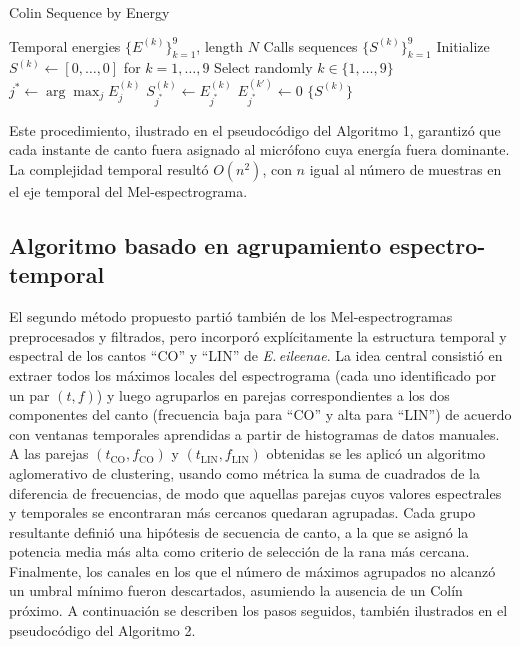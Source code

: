 \begin{algorithm}
    \caption{Colin Sequence by Energy}
    \begin{algorithmic}[1]
    \Require 
      Temporal energies \(\{E^{(k)}\}_{k=1}^9\), length \(N\)
    \Ensure
      Calls sequences \(\{S^{(k)}\}_{k=1}^9\)
    \State Initialize \(S^{(k)} \leftarrow [0,\dots,0]\) for \(k=1,\dots,9\)
      \State Select randomly \(k\in\{1,\dots,9\}\)
      \State \(j^* \leftarrow \arg\max_j E^{(k)}_j\)
      \State \(S^{(k)}_{j^*} \leftarrow E^{(k)}_{j^*}\)
        \State \(E^{(k')}_{j^*} \leftarrow 0\)
      \EndFor
    \EndWhile
    \State \Return \(\{S^{(k)}\}\)
    \end{algorithmic}
\end{algorithm}

Este procedimiento, ilustrado en el pseudocódigo del 
Algoritmo 1, garantizó que cada instante de canto fuera 
asignado al micrófono cuya energía fuera dominante. 
La complejidad temporal resultó \(O(n^2)\), con \(n\) igual al 
número de muestras en el eje temporal del Mel-espectrograma.



\subsection{Algoritmo basado en agrupamiento espectro-temporal}
\label{sec:alg_aglomerativo}

El segundo método propuesto partió también de los 
Mel-espectrogramas preprocesados y filtrados, pero incorporó 
explícitamente la estructura temporal y espectral de los cantos 
“CO” y “LIN” de \emph{E.\,eileenae}. La idea central consistió 
en extraer todos los máximos locales del espectrograma (cada 
uno identificado por un par \((t,f)\)) y luego agruparlos en 
parejas correspondientes a los dos componentes del canto 
(frecuencia baja para “CO” y alta para “LIN”) de acuerdo con 
ventanas temporales aprendidas a partir de histogramas de datos 
manuales. A las parejas \((t_{\mathrm{CO}},f_{\mathrm{CO}})\) y 
\((t_{\mathrm{LIN}},f_{\mathrm{LIN}})\) obtenidas se les aplicó 
un algoritmo aglomerativo de clustering, usando como métrica la 
suma de cuadrados de la diferencia de frecuencias, de modo que 
aquellas parejas cuyos valores espectrales y temporales se 
encontraran más cercanos quedaran agrupadas. Cada grupo 
resultante definió una hipótesis de secuencia de canto, a la que 
se asignó la potencia media más alta como criterio de selección 
de la rana más cercana. Finalmente, los canales en los que el 
número de máximos agrupados no alcanzó un umbral mínimo fueron 
descartados, asumiendo la ausencia de un Colín próximo.
A continuación se describen los pasos seguidos, también 
ilustrados en el pseudocódigo del Algoritmo 2.

